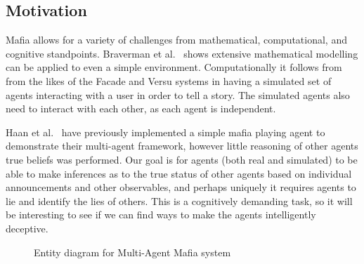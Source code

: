 \documentclass[12pt]{article} %
\begin{document}

\subsection{Motivation} 

Mafia allows for a variety of challenges from mathematical, computational, and cognitive standpoints. Braverman et al.~\cite{BRA2008} shows extensive mathematical modelling can be applied to even a simple environment. Computationally it follows from from the likes of the Facade and Versu systems in having a simulated set of agents interacting with a user in order to tell a story. The simulated agents also need to interact with each other, as each agent is independent. 

Haan et al.~\cite{HAA2004} have previously implemented a simple mafia playing agent to demonstrate their multi-agent framework, however little reasoning of other agents true beliefs was performed. Our goal is for agents (both real and simulated) to be able to make inferences as to the true status of other agents based on individual announcements and other observables, and perhaps uniquely it requires agents to lie and identify the lies of others. This is a cognitively demanding task, so it will be interesting to see if we can find ways to make the agents intelligently deceptive. 


\begin{figure}[H] 
\caption{Entity diagram for Multi-Agent Mafia system}
\label{fig:speciation}
\end{figure}
\end{document}
